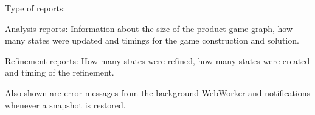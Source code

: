    \stopsubsubject

    \startsubsubject[title={Widget: Log Messages}]

        Type of reports:

        \startitemize[packed]
            \item{Analysis reports: Information about the size of the product game graph, how many states were updated and timings for the game construction and solution.}
            \item{Refinement reports: How many states were refined, how many states were created and timing of the refinement.}
        \stopitemize

        Also shown are error messages from the background WebWorker and notifications whenever a snapshot is restored.

    \stopsubsubject

\stopsubject



